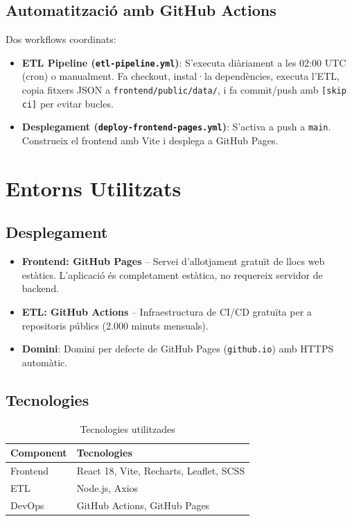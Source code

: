 \documentclass[11pt, a4paper]{article}
\begin{document}
\subsection{Automatització amb GitHub Actions}

Dos workflows coordinats:
\begin{itemize}[leftmargin=*]
    \item \textbf{ETL Pipeline (\texttt{etl-pipeline.yml})}: S'executa diàriament a les 02:00 UTC (cron) o manualment. Fa checkout, instal·la dependències, executa l'ETL, copia fitxers JSON a \texttt{frontend/public/data/}, i fa commit/push amb \texttt{[skip ci]} per evitar bucles.
    \item \textbf{Desplegament (\texttt{deploy-frontend-pages.yml})}: S'activa a push a \texttt{main}. Construeix el frontend amb Vite i desplega a GitHub Pages.
\end{itemize}


\section{Entorns Utilitzats}

\subsection{Desplegament}

\begin{itemize}[leftmargin=*]
    \item \textbf{Frontend: GitHub Pages} -- Servei d'allotjament gratuït de llocs web estàtics. L'aplicació és completament estàtica, no requereix servidor de backend.
    \item \textbf{ETL: GitHub Actions} -- Infraestructura de CI/CD gratuïta per a repositoris públics (2.000 minuts mensuals).
    \item \textbf{Domini}: Domini per defecte de GitHub Pages (\texttt{github.io}) amb HTTPS automàtic.
\end{itemize}

\subsection{Tecnologies}

\begin{table}[h]
\centering
\begin{tabular}{@{}ll@{}}
\toprule
\textbf{Component} & \textbf{Tecnologies} \\
\midrule
Frontend & React 18, Vite, Recharts, Leaflet, SCSS \\
ETL & Node.js, Axios \\
DevOps & GitHub Actions, GitHub Pages \\
\bottomrule
\end{tabular}
\caption{Tecnologies utilitzades}
\end{table}
\end{document}
